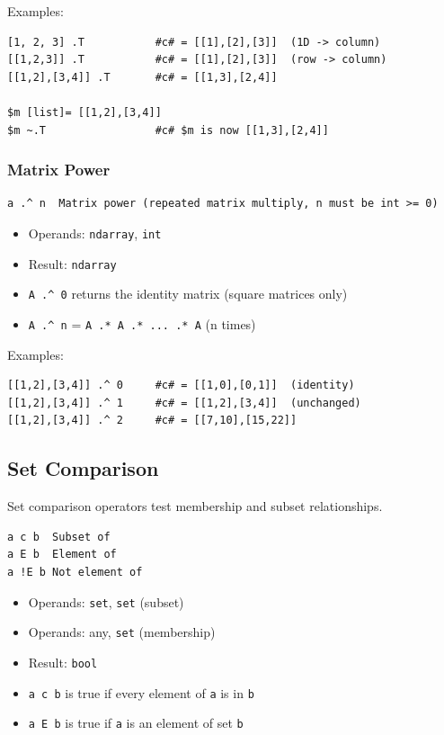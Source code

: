 \documentclass{report}
\begin{document}
Examples:
\begin{verbatim}
[1, 2, 3] .T           #c# = [[1],[2],[3]]  (1D -> column)
[[1,2,3]] .T           #c# = [[1],[2],[3]]  (row -> column)
[[1,2],[3,4]] .T       #c# = [[1,3],[2,4]]

$m [list]= [[1,2],[3,4]]
$m ~.T                 #c# $m is now [[1,3],[2,4]]
\end{verbatim}

\subsubsection{Matrix Power}
\begin{verbatim}
a .^ n  Matrix power (repeated matrix multiply, n must be int >= 0)
\end{verbatim}

\begin{itemize}
\item Operands: \texttt{ndarray}, \texttt{int}
\item Result: \texttt{ndarray}
\item \texttt{A .\^{} 0} returns the identity matrix (square matrices only)
\item \texttt{A .\^{} n} = \texttt{A .* A .* ... .* A} (n times)
\end{itemize}

Examples:
\begin{verbatim}
[[1,2],[3,4]] .^ 0     #c# = [[1,0],[0,1]]  (identity)
[[1,2],[3,4]] .^ 1     #c# = [[1,2],[3,4]]  (unchanged)
[[1,2],[3,4]] .^ 2     #c# = [[7,10],[15,22]]
\end{verbatim}

\subsection{Set Comparison}
Set comparison operators test membership and subset relationships.
\begin{verbatim}
a c b  Subset of
a E b  Element of
a !E b Not element of
\end{verbatim}

\begin{itemize}
\item Operands: \texttt{set}, \texttt{set} (subset)
\item Operands: any, \texttt{set} (membership)
\item Result: \texttt{bool}
\item \texttt{a c b} is true if every element of \texttt{a} is in \texttt{b}
\item \texttt{a E b} is true if \texttt{a} is an element of set \texttt{b}
\end{itemize}
\end{document}
